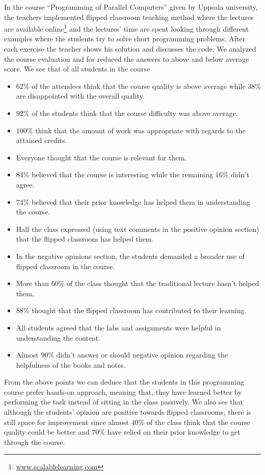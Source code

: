 \documentclass{article}
\begin{document}
In the course ``Programming of Parallel Computers'' given by Uppsala university, 
the teachers implemented flipped classroom teaching method where the
lectures are available online\footnote{\url{www.scalablelearning.com}}
and the lectures' time are spent looking through different examples
where the students try to solve short programming problems. After each
exercise the teacher shows his solution and discusses the code. We
analyzed the course evaluation and for reduced the answers to above
and below average score. We see that of all students in the course
\begin{itemize}
	\item $62\%$ of the attendees think that the course quality is
		above average while $38\%$ are disappointed with the
		overall quality.
	\item $92\%$ of the students think that the course difficulty
		was above average.
	\item $100\%$ think that the amount of work was appropriate
		with regards to the attained credits.
	\item Everyone thought that the course is relevant for them.
	\item $84\%$ believed that the course is interesting while the
		remaining $16\%$ didn't agree.
	\item $74\%$ believed that their prior knowledge has helped
		them in understanding the course.
	\item Half the class expressed (using text comments in the
		positive opinion section) that the flipped classroom has helped them.
	\item In the negative opinions section, the students demanded
		a broader use of flipped classroom in the course.
	\item More than $60\%$ of the class thought that the
		traditional lecture hasn't helped them.
	\item $88\%$ thought that the flipped classroom has
		contributed to their learning.
	\item All students agreed that the labs and assignments were helpful in
		understanding the content.
	\item Almost $90\%$ didn't answer or should negative opinion
		regarding the helpfulness of the books and notes.
\end{itemize}
From the above points we can deduce that the students in this
programming course prefer hands-on approach, meaning that, they have
learned better by performing the task instead of sitting in the class
passively. We also see that although the students' opinion are
positive towards flipped classrooms, there is still space for
improvement since almost $40\%$ of the class think that the course
quality could be better and $70\%$ have relied on their prior
knowledge to get through the course.
\end{document}

